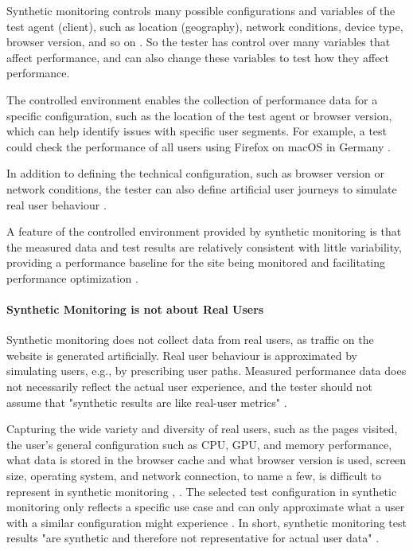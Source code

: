 Synthetic monitoring controls many possible configurations and variables of the test agent (client), such as location (geography), network conditions, device type, browser version, and so on \cite{2021MDNRUMvsSynthetic}.
So the tester has control over many variables that affect performance, and can also change these variables to test how they affect performance.

The controlled environment enables the collection of performance data for a specific configuration, such as the location of the test agent or browser version, which can help identify issues with specific user segments.
For example, a test could check the performance of all users using Firefox on macOS in Germany \cite{2009Croll}.

In addition to defining the technical configuration, such as browser version or network conditions, the tester can also define artificial user journeys to simulate real user behaviour \cite{2021Wingerath}.

A feature of the controlled environment provided by synthetic monitoring is that the measured data and test results are relatively consistent with little variability, providing a performance baseline for the site being monitored and facilitating performance optimization \cite{2013Meenan}.


\paragraph{Synthetic Monitoring is not about Real Users} %

Synthetic monitoring does not collect data from real users, as traffic on the website is generated artificially.
Real user behaviour is approximated by simulating users, e.g., by prescribing user paths.
Measured performance data does not necessarily reflect the actual user experience, and the tester should not assume that "synthetic results are like real-user metrics" \cite{2016Viscomi}.

Capturing the wide variety and diversity of real users, such as the pages visited, the user's general configuration such as CPU, GPU, and memory performance, what data is stored in the browser cache and what browser version is used, screen size, operating system, and network connection, to name a few, is difficult to represent in synthetic monitoring \cite{2013Meenan}, \cite{2013Grigorik}.
The selected test configuration in synthetic monitoring only reflects a specific use case and can only approximate what a user with a similar configuration might experience \cite{2016Viscomi}.
In short, synthetic monitoring test results "are synthetic and therefore not representative for actual user data" \cite{2021Wingerath}.



